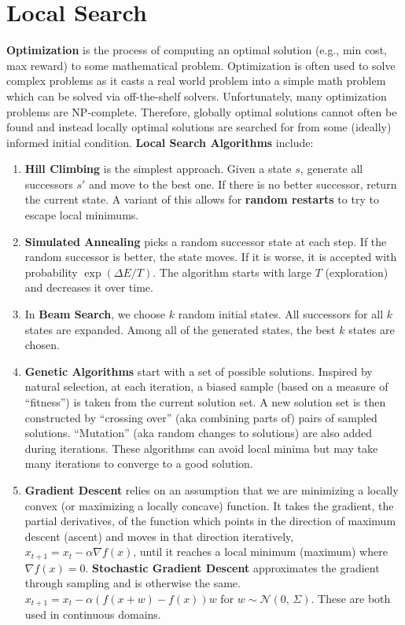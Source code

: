 \documentclass[a4paper]{article}
\begin{document}
\section*{Local Search}
\noindent \textbf{Optimization} is the process of computing an optimal solution (e.g., min cost, max reward) to some mathematical problem. Optimization is often used to solve complex problems as it casts a real world problem into a simple math problem which can be solved via off-the-shelf solvers. Unfortunately, many optimization problems are NP-complete. Therefore, globally optimal solutions cannot often be found and instead locally optimal solutions are searched for from some (ideally) informed initial condition. \textbf{Local Search Algorithms} include:
\begin{enumerate}
    \item \textbf{Hill Climbing} is the simplest approach. Given a state $s$, generate all successors $s'$ and move to the best one. If there is no better successor, return the current state. A variant of this allows for \textbf{random restarts} to try to escape local minimums.
    \item \textbf{Simulated Annealing} picks a random successor state at each step. If the random successor is better, the state moves. If it is worse, it is accepted with probability $\exp(\Delta E / T)$. The algorithm starts with large $T$ (exploration) and decreases it over time. 
    \item In \textbf{Beam Search}, we choose $k$ random initial states. All successors for all $k$ states are expanded. Among all of the generated states, the best $k$ states are chosen. 
    \item \textbf{Genetic Algorithms} start with a set of possible solutions. Inspired by natural selection, at each iteration, a biased sample (based on a measure of ``fitness'') is taken from the current solution set. A new solution set is then constructed by ``crossing over'' (aka combining parts of) pairs of sampled solutions. ``Mutation'' (aka random changes to solutions) are also added during iterations. These algorithms can avoid local minima but may take many iterations to converge to a good solution.
    \item \textbf{Gradient Descent} relies on an assumption that we are minimizing a locally convex (or maximizing a locally concave) function. It takes the gradient, the partial derivatives, of the function which points in the direction of maximum descent (ascent) and moves in that direction iteratively, $x_{t+1} = x_t - \alpha \nabla f(x)$, until it reaches a local minimum (maximum) where $\nabla f(x) = 0$. \textbf{Stochastic Gradient Descent} approximates the gradient through sampling and is otherwise the same. $x_{t+1} = x_t - \alpha \left(f(x+w) - f(x)\right)w$ for $w \sim \mathcal{N}(0,\,\Sigma)$. These are both used in continuous domains.
\end{enumerate}
\end{document}
